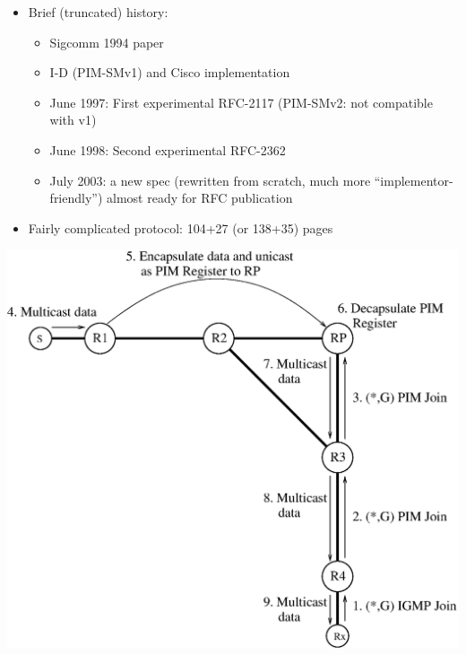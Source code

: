 \documentclass[landscape]{icsislides}
\begin{document}
\begin{slide}

\begin{itemize}
  \item Brief (truncated) history:
  \begin{itemize}
    \item Sigcomm 1994 paper
    \item I-D (PIM-SMv1) and Cisco implementation
    \item June 1997: First experimental RFC-2117 (PIM-SMv2: not compatible
    with v1)
    \item June 1998: Second experimental RFC-2362
    \item July 2003: a new spec (rewritten from scratch, much more
  ``implementor-friendly'') almost ready for RFC publication
  \end{itemize}

  \item Fairly complicated protocol: 104+27 (or 138+35) pages

\end{itemize}

\end{slide}

\begin{slide}

\begin{center}
  \includegraphics[width=6.0in]{figs/pim_protocol_overview1}
\end{center}

\end{slide}
\end{document}

